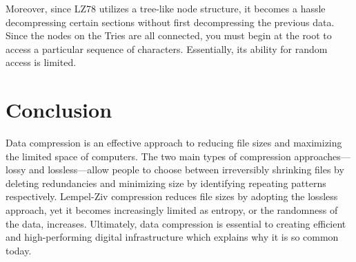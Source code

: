 \documentclass[12pt]{article}
\begin{document}
\vspace{0.2in}

Moreover, since LZ78 utilizes a tree-like node structure, it becomes a hassle decompressing certain sections without first decompressing the previous data. Since the nodes on the Tries are all connected, you must begin at the root to access a particular sequence of characters. Essentially, its ability for random access is limited. 

\section{Conclusion}

Data compression is an effective approach to reducing file sizes and maximizing the limited space of computers. The two main types of compression approaches---lossy and lossless---allow people to choose between irreversibly shrinking files by deleting redundancies and minimizing size by identifying repeating patterns respectively. Lempel-Ziv compression reduces file sizes by adopting the lossless approach, yet it becomes increasingly limited as entropy, or the randomness of the data, increases. Ultimately, data compression is essential to creating efficient and high-performing digital infrastructure which explains why it is so common today.
\end{document}
